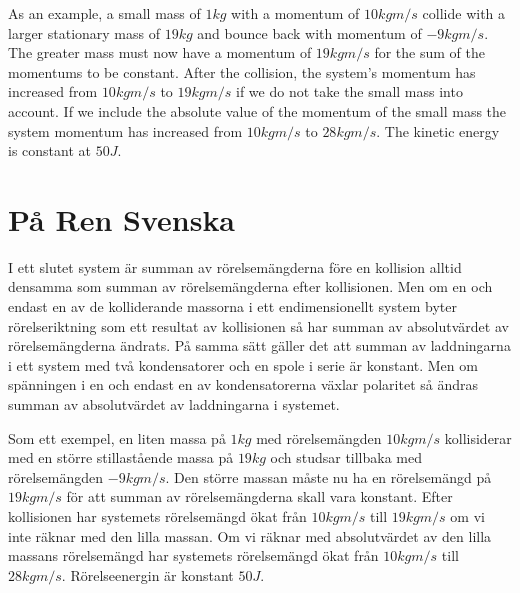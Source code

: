\documentclass[]{../common/elementary-physics}
\begin{document}
As an example, a small mass of $1 kg$ with a momentum of $10 kgm/s$ collide with a larger stationary mass of $19 kg$ and bounce back with momentum of $-9 kgm/s$.
The greater mass must now have a momentum of $19 kgm/s$ for the sum of the momentums to be constant.
After the collision, the system's momentum has increased from $10 kgm/s$ to $19 kgm/s$ if we do not take the small mass into account.
If we include the absolute value of the momentum of the small mass the system momentum has increased from $10 kgm/s$ to $28 kgm/s$.
The kinetic energy is constant at $50 J$.

\section{På Ren Svenska}

I ett slutet system är summan av rörelsemängderna före en kollision alltid densamma som summan av rörelsemängderna efter kollisionen.
Men om en och endast en av de kolliderande massorna i ett endimensionellt system byter rörelseriktning som ett resultat av kollisionen så har summan av absolutvärdet av rörelsemängderna ändrats.
På samma sätt gäller det att summan av laddningarna i ett  system med två kondensatorer och en spole i serie är konstant.
Men om spänningen i en och endast en av kondensatorerna växlar polaritet så ändras summan av absolutvärdet av laddningarna i systemet.

Som ett exempel, en liten massa på $1 kg$ med rörelsemängden $10 kgm/s$ kollisiderar med en större stillastående massa på $19 kg$ och studsar tillbaka med rörelsemängden $-9 kgm/s$.
Den större massan måste nu ha en rörelsemängd på $19 kgm/s$ för att summan av rörelsemängderna skall vara konstant.
Efter kollisionen har systemets rörelsemängd ökat från $10 kgm/s$ till $19 kgm/s$ om vi inte räknar med den lilla massan.
Om vi räknar med absolutvärdet av den lilla massans rörelsemängd har systemets rörelsemängd ökat från $10 kgm/s$ till $28 kgm/s$.
Rörelseenergin är konstant $50 J$.



\printbibliography
\end{document}
